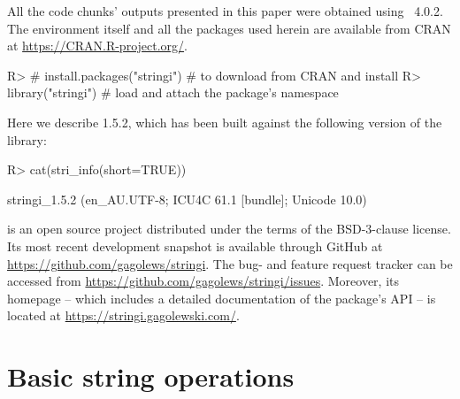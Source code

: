 \documentclass[nojss]{jss}
\begin{document}
All the code chunks' outputs presented in this paper were obtained using
~4.0.2.
The  environment itself and all the packages used herein
are available from CRAN at \url{https://CRAN.R-project.org/}.

\begin{Schunk}
\begin{Sinput}
R> # install.packages("stringi")  # to download from CRAN and install
R> library("stringi")  # load and attach the package's namespace
\end{Sinput}
\end{Schunk}

\noindent
Here we describe  1.5.2,
which has been built against the following version of the  library:



\begin{Schunk}
\begin{Sinput}
R> cat(stri_info(short=TRUE))
\end{Sinput}
\end{Schunk}

\begin{Schunk}
\begin{Soutput}
stringi_1.5.2 (en_AU.UTF-8; ICU4C 61.1 [bundle]; Unicode 10.0)
\end{Soutput}
\end{Schunk}


\noindent
{} is an open source project
distributed under the terms of the BSD-3-clause license.
Its most recent development snapshot is available through GitHub at
\url{https://github.com/gagolews/stringi}. The bug- and feature request tracker
can be accessed from \url{https://github.com/gagolews/stringi/issues}.
Moreover, its homepage -- which includes a detailed documentation
of the package's API -- is located at \url{https://stringi.gagolewski.com/}.



\section{Basic string operations}\label{Sec:basic}
\end{document}
